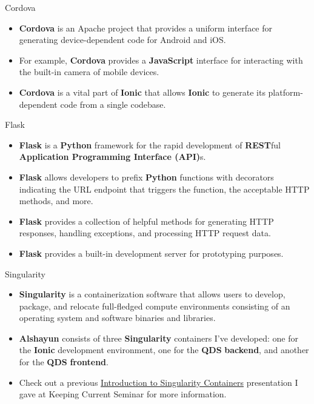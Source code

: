 \documentclass{beamer}
\begin{document}
\begin{frame}{Cordova}
    \begin{itemize}
        \item \textbf{Cordova} is an Apache project that provides a uniform
            interface for generating device-dependent code for Android and iOS.
        \item For example, \textbf{Cordova} provides a \textbf{JavaScript}
            interface for interacting with the built-in camera of mobile
            devices.
        \item \textbf{Cordova} is a vital part of \textbf{Ionic} that allows
            \textbf{Ionic} to generate its platform-dependent code from a single
            codebase.
    \end{itemize}
\end{frame}

\begin{frame}{Flask}
    \begin{itemize}
        \item \textbf{Flask} is a \textbf{Python} framework for the rapid
            development of \textbf{REST}ful \textbf{Application Programming
            Interface (API)}s.
        \item \textbf{Flask} allows developers to prefix \textbf{Python}
            functions with decorators indicating the URL endpoint that triggers
            the function, the acceptable HTTP methods, and more.
        \item \textbf{Flask} provides a collection of helpful methods for generating HTTP
            responses, handling exceptions, and processing HTTP request data.
        \item \textbf{Flask} provides a built-in development server for
            prototyping purposes.
    \end{itemize}
\end{frame}

\begin{frame}{Singularity}
    \begin{itemize}
        \item \textbf{Singularity} is a containerization software that allows
            users to develop, package, and relocate full-fledged compute
            environments consisting of an operating system and software binaries
            and libraries.
        \item \textbf{Alshayun} consists of three \textbf{Singularity}
            containers I've developed: one for the \textbf{Ionic} development
            environment, one for the \textbf{QDS} \textbf{backend}, and another
            for the \textbf{QDS} \textbf{frontend}.
        \item Check out a previous
            \href{https://youtu.be/NeTRm7_JwX8}{Introduction to Singularity
            Containers} presentation I gave at Keeping Current Seminar for more
            information.
    \end{itemize}
\end{frame}
\end{document}
